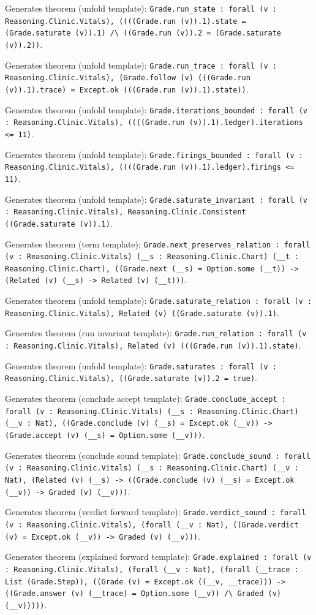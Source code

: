 \documentclass[11pt]{article}
\begin{document}
\noindent Generates theorem (unfold template): \texttt{Grade.run\_state : forall (v : Reasoning.Clinic.Vitals), ((((Grade.run (v)).1).state = (Grade.saturate (v)).1) /\textbackslash{} ((Grade.run (v)).2 = (Grade.saturate (v)).2))}.\par
\noindent Generates theorem (unfold template): \texttt{Grade.run\_trace : forall (v : Reasoning.Clinic.Vitals), (Grade.follow (v) (((Grade.run (v)).1).trace) = Except.ok (((Grade.run (v)).1).state))}.\par
\noindent Generates theorem (unfold template): \texttt{Grade.iterations\_bounded : forall (v : Reasoning.Clinic.Vitals), ((((Grade.run (v)).1).ledger).iterations <= 11)}.\par
\noindent Generates theorem (unfold template): \texttt{Grade.firings\_bounded : forall (v : Reasoning.Clinic.Vitals), ((((Grade.run (v)).1).ledger).firings <= 11)}.\par
\noindent Generates theorem (unfold template): \texttt{Grade.saturate\_invariant : forall (v : Reasoning.Clinic.Vitals), Reasoning.Clinic.Consistent ((Grade.saturate (v)).1)}.\par
\noindent Generates theorem (term template): \texttt{Grade.next\_preserves\_relation : forall (v : Reasoning.Clinic.Vitals) (\_\_s : Reasoning.Clinic.Chart) (\_\_t : Reasoning.Clinic.Chart), ((Grade.next (\_\_s) = Option.some (\_\_t)) -> (Related (v) (\_\_s) -> Related (v) (\_\_t)))}.\par
\noindent Generates theorem (unfold template): \texttt{Grade.saturate\_relation : forall (v : Reasoning.Clinic.Vitals), Related (v) ((Grade.saturate (v)).1)}.\par
\noindent Generates theorem (run invariant template): \texttt{Grade.run\_relation : forall (v : Reasoning.Clinic.Vitals), Related (v) (((Grade.run (v)).1).state)}.\par
\noindent Generates theorem (unfold template): \texttt{Grade.saturates : forall (v : Reasoning.Clinic.Vitals), ((Grade.saturate (v)).2 = true)}.\par
\noindent Generates theorem (conclude accept template): \texttt{Grade.conclude\_accept : forall (v : Reasoning.Clinic.Vitals) (\_\_s : Reasoning.Clinic.Chart) (\_\_v : Nat), ((Grade.conclude (v) (\_\_s) = Except.ok (\_\_v)) -> (Grade.accept (v) (\_\_s) = Option.some (\_\_v)))}.\par
\noindent Generates theorem (conclude sound template): \texttt{Grade.conclude\_sound : forall (v : Reasoning.Clinic.Vitals) (\_\_s : Reasoning.Clinic.Chart) (\_\_v : Nat), (Related (v) (\_\_s) -> ((Grade.conclude (v) (\_\_s) = Except.ok (\_\_v)) -> Graded (v) (\_\_v)))}.\par
\noindent Generates theorem (verdict forward template): \texttt{Grade.verdict\_sound : forall (v : Reasoning.Clinic.Vitals), (forall (\_\_v : Nat), ((Grade.verdict (v) = Except.ok (\_\_v)) -> Graded (v) (\_\_v)))}.\par
\noindent Generates theorem (explained forward template): \texttt{Grade.explained : forall (v : Reasoning.Clinic.Vitals), (forall (\_\_v : Nat), (forall (\_\_trace : List (Grade.Step)), ((Grade (v) = Except.ok ((\_\_v, \_\_trace))) -> ((Grade.answer (v) (\_\_trace) = Option.some (\_\_v)) /\textbackslash{} Graded (v) (\_\_v)))))}.\par
\end{document}
